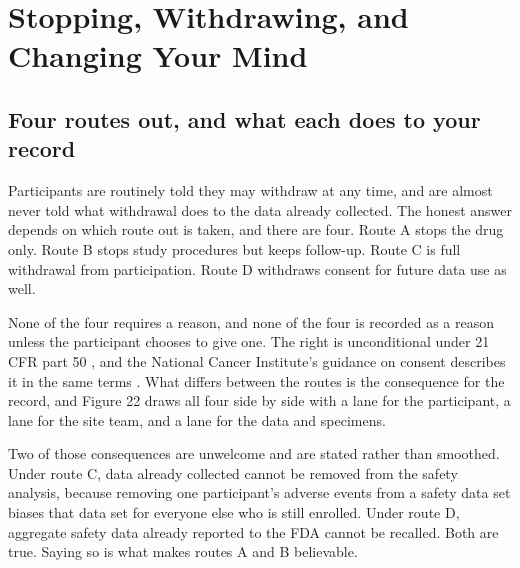 \section{Stopping, Withdrawing, and Changing Your Mind}

\subsection{Four routes out, and what each does to your record}

Participants are routinely told they may withdraw at any time, and are almost
never told what withdrawal does to the data already collected. The honest answer
depends on which route out is taken, and there are four. Route A stops the drug
only. Route B stops study procedures but keeps follow-up. Route C is full
withdrawal from participation. Route D withdraws consent for future data use as
well.

None of the four requires a reason, and none of the four is recorded as a reason
unless the participant chooses to give one. The right is unconditional under 21
CFR part 50 \cite{ecfr2026part50}, and the National Cancer Institute's guidance
on consent describes it in the same terms \cite{NCIConsent24}. What differs
between the routes is the consequence for the record, and Figure 22 draws all
four side by side with a lane for the participant, a lane for the site team, and
a lane for the data and specimens.

Two of those consequences are unwelcome and are stated rather than smoothed.
Under route C, data already collected cannot be removed from the safety
analysis, because removing one participant's adverse events from a safety data
set biases that data set for everyone else who is still enrolled. Under route D,
aggregate safety data already reported to the FDA cannot be recalled. Both are
true. Saying so is what makes routes A and B believable.

